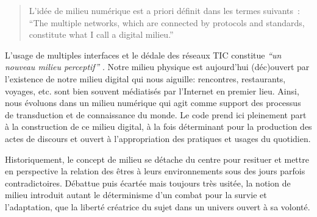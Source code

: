 \begin{quote}
L’idée de milieu numérique est a priori définit dans les termes suivants : 
“The multiple networks, which are connected by protocols and standards, constitute what I call a digital milieu.” \citep{Hui2012}
\end{quote}

L’usage de multiples interfaces et le dédale des réseaux TIC constitue \textit{“un nouveau milieu perceptif”} \citep{Weissberg2007}. Notre milieu physique est aujourd’hui (déc)ouvert par l’existence de notre milieu digital qui nous aiguille: rencontres, restaurants, voyages, etc. sont bien souvent médiatisés par l’Internet en premier lieu. Ainsi, nous évoluons dans un milieu numérique qui agit comme support des processus de transduction et de connaissance du monde. Le code prend ici pleinement part à la construction de ce milieu digital, à la fois déterminant pour la production des actes de discours et ouvert à l’appropriation des pratiques et usages du quotidien.

Historiquement, le concept de milieu se détache du centre pour resituer et mettre en perspective la relation des êtres à leurs environnements sous des jours parfois contradictoires. Débattue puis écartée mais toujours très usitée, la notion de milieu introduit autant le déterminisme d’un combat pour la survie et l’adaptation, que la liberté créatrice du sujet dans un univers ouvert à sa volonté. 


